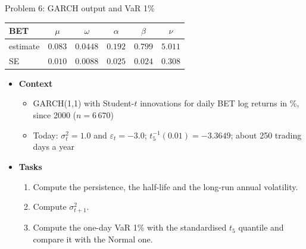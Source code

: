 \begin{frame}{Problem 6: GARCH output and VaR 1\%}
\itemsize{\footnotesize}
\begin{center}
\scriptsize
\begin{tabular}{lccccc}
\toprule
\textbf{BET} & $\mu$ & $\omega$ & $\alpha$ & $\beta$ & $\nu$ \\
\midrule
estimate & $0.083$ & $0.0448$ & $0.192$ & $0.799$ & $5.011$ \\
SE & $0.010$ & $0.0088$ & $0.025$ & $0.024$ & $0.308$ \\
\bottomrule
\end{tabular}
\end{center}
\begin{itemize}
    \item \textbf{Context}
    \begin{itemize}
        \item GARCH(1,1) with Student-$t$ innovations for daily BET log returns in \%, since 2000 ($n = 6\,670$)
        \item Today: $\sigma_t^2 = 1.0$ and $\varepsilon_t = -3.0$; $t_5^{-1}(0.01) = \ensuremath{-}3.3649$; about 250 trading days a year
    \end{itemize}
    \item \textbf{Tasks}
\begin{enumerate}
    \item Compute the persistence, the half-life and the long-run annual volatility.
    \item Compute $\sigma_{t+1}^2$.
    \item Compute the one-day VaR 1\% with the standardised $t_5$ quantile and compare it with the Normal one.
\end{enumerate}
\end{itemize}
\end{frame}

